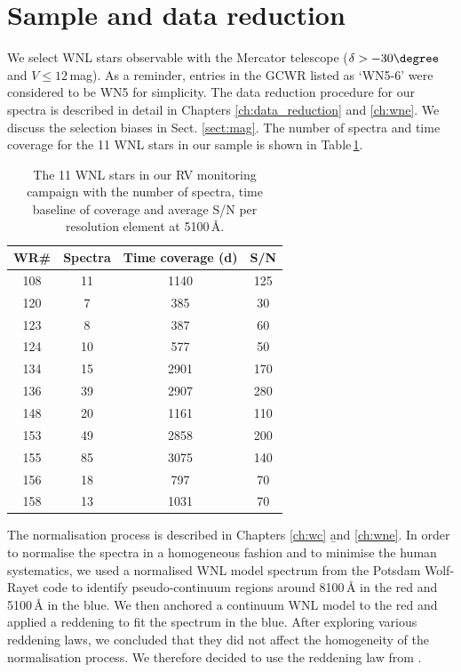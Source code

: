 \section{Sample and data reduction} \label{sect:sample_WNL}

We select WNL stars observable with the Mercator telescope ($\delta>-30\degree$ and $V\le12$\,mag). As a reminder, entries in the GCWR listed as `WN5-6' were considered to be WN5 for simplicity. The data reduction procedure for our spectra is described in detail in Chapters \ref{ch:data_reduction} and \ref{ch:wne}. We discuss the selection biases in Sect. \ref{sect:mag}. The number of spectra and time coverage for the 11 WNL stars in our sample is shown in Table\,\ref{tab:time_coverage_spec}.

\begin{table}[]
    \centering
    \caption{The 11 WNL stars in our RV monitoring campaign with the number of spectra, time baseline of coverage and average S/N per resolution element at 5100\,\r{A}.}
    \begin{tabular}{cccc}
    \hline \hline
    WR\#&Spectra&Time coverage (d)&S/N\\ \hline
    108&11&1140&125\\
    120&7&385&30\\
    123&8&387&60\\
    124&10&577&50\\
    134&15&2901&170\\
    136&39&2907&280\\
    148&20&1161&110\\
    153&49&2858&200\\
    155&85&3075&140\\
    156&18&797&70\\
    158&13&1031&70\\
    \hline
    \end{tabular}
    \label{tab:time_coverage_spec}
\end{table}

The normalisation \b{process} is described in Chapters \ref{ch:wc} \b{and \ref{ch:wne}}. In order to normalise the spectra in a homogeneous fashion and to minimise the human systematics, we used a normalised WNL model spectrum from the Potsdam Wolf-Rayet code \citep{grafener_line-blanketed_2002,todt_potsdam_2015} to identify pseudo-continuum regions around 8100\,\r{A} in the red and 5100\,\r{A} in the blue. We then anchored a continuum WNL model to the red and applied a reddening to fit the spectrum in the blue. After exploring various reddening laws, we concluded that they did not affect the homogeneity of the normalisation process. We therefore decided to use the reddening law from \citet{fitzpatrick_interstellar_2004}.

